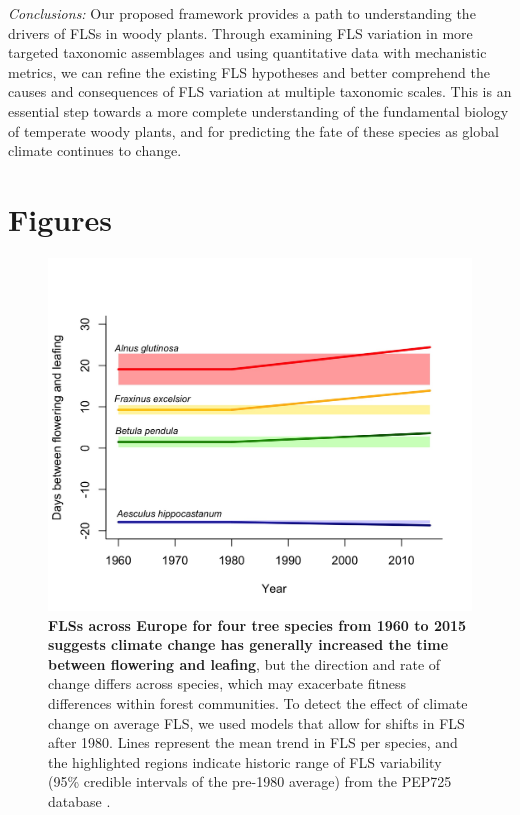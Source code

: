 \documentclass{article}
\begin{document}
\emph{Conclusions:} Our proposed framework provides a path to understanding the drivers of FLSs in woody plants. Through examining FLS variation in more targeted taxonomic assemblages and using quantitative data with mechanistic metrics, we can refine the existing FLS hypotheses and better comprehend the causes and consequences of FLS variation at multiple taxonomic scales. This is an essential step towards a more complete understanding of the fundamental biology of temperate woody plants, and for predicting the fate of these species as global climate continues to change.


 
\pagebreak

\section*{Figures}
\begin{figure}[h!]
    \centering
 \includegraphics[width=\textwidth]{..//PEP725/FLS_climate_change.jpeg} 
    \caption{\textbf{FLSs across Europe for four tree species from 1960 to 2015 suggests climate change has generally increased the time between flowering and leafing}, but the direction and rate of change differs across species, which may exacerbate fitness differences within forest communities. To detect the effect of climate change on average FLS, we used models that allow for shifts in FLS after 1980. Lines represent the mean trend in FLS per species, and the highlighted regions indicate historic range of FLS variability (95\% credible intervals of the pre-1980 average) from the PEP725 database \citep{PEP725}.}
    \label{fig:climchange}
\end{figure}
 
\end{document}
